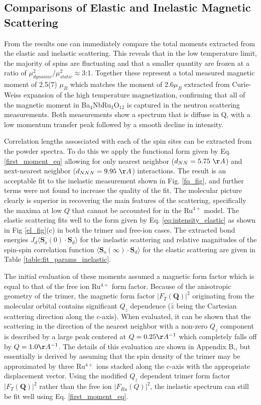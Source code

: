 \documentclass[%
 reprint,
superscriptaddress,
 amsmath,amssymb,
 aps,
 prb,
]{revtex4-2}
\begin{document}
\subsection{Comparisons of Elastic and Inelastic Magnetic Scattering}

From the results one can immediately compare the total moments extracted from the elastic and inelastic scattering. This reveals that in the low temperature limit, the majority of spins are fluctuating and that a smaller quantity are frozen at a ratio of $\mu_{dynamic}^2 / \mu_{static}^2 \approx$3:1. Together these represent a total measured magnetic moment of 2.5(7) $\mu_B$ which matches the moment of $2.6\mu_{B}$ extracted from Curie-Weiss expansion of the high temperature magnetization, confirming that all of the magnetic moment in Ba$_4$NbRu$_3$O$_{12}$ is captured in the neutron scattering measurements. Both measurements show a spectrum that is diffuse in Q, with a low momentum transfer peak followed by a smooth decline in intensity. 

Correlation lengths assosciated with each of the spin sites can be extracted from the powder spectra. To do this we apply the functional form given by Eq. \ref{first_moment_eq} allowing for only nearest neighbor ($d_{NN}=5.75\ \AA$) and next-nearest neighbor ($d_{NNN}=9.95\ \AA$) interactions. The result is an acceptable fit to the inelastic measurement shown in Fig. \ref{fq_fig}, and further terms were not found to increase the quality of the fit. The molecular picture clearly is superior in recovering the main features of the scattering, specifically the maxima at low $Q$ that cannot be accounted for in the Ru$^{4+}$ model. The elastic scattering fits well to the form given by Eq. \ref{eq:intensity_elastic} as shown in Fig \ref{el_fig}(c) in both the trimer and free-ion cases. The extracted bond energies $J_d\langle \textbf{S}_o(0) \cdot \textbf{S}_d\rangle$ for the inelastic scattering and relative magnitudes of the spin-spin correlation function $\langle \textbf{S}_o(\infty)\cdot \textbf{S}_d \rangle$ for the elastic scattering are given in Table \ref{table:fit_params_inelastic}. 

The initial evaluation of these moments assumed a magnetic form factor which is equal to that of the free ion Ru$^{4+}$ form factor. Because of the anisotropic geometry of the trimer, the magnetic form factor $|F_T(\textbf{Q})|^2$ originating from the molecular orbital contains significant $Q_z$ dependence ($\hat{z}$ being the Cartesian scattering direction along the c-axis). When evaluated, it can be shown that the scattering in the direction of the nearest neighbor with a non-zero $Q_z$ component is described by a large peak centered at $Q=0.25 \AA^{-1}$ which completely falls off by $Q=1.0 \AA^{-1}$. The details of this evaluation are shown in Appendix B,, but essentially is derived by assuming that the spin density of the trimer may be approximated by three Ru$^{4+}$ ions stacked along the c-axis with the appropriate displacement vector. Using the modified $Q_z$ dependent trimer form factor $|F_T(\textbf{Q})|^2$ rather than the free ion $|F_{Ru}(Q)|^2$, the inelastic spectrum can still be fit well using Eq. \ref{first_moment_eq}.
\end{document}
